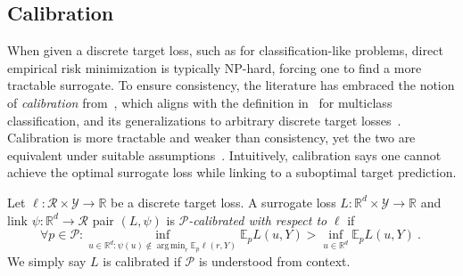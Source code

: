 \documentclass[anon,12pt]{colt2021} %
\newcommand{\reals}{\mathbb{R}}
\newcommand{\E}{\mathbb{E}}
\newcommand{\R}{\mathcal{R}}
\renewcommand{\P}{\mathcal{P}}
\newcommand{\Y}{\mathcal{Y}}
\newcommand{\exploss}[3]{\E_{#3} #1(#2,Y)}
\DeclareMathOperator*{\argmin}{arg\,min}
\begin{document}
\subsection{Calibration}\label{subsec:calibration}

When given a discrete target loss, such as for classification-like problems, direct empirical risk minimization is typically NP-hard, forcing one to find a more tractable surrogate.
To ensure consistency, the literature has embraced the notion of \emph{calibration} from~\citet[Chapter 3]{steinwart2008support}, which aligns with the definition in~\citet{tewari2007consistency} for multiclass classification, and its generalizations to arbitrary discrete target losses~\citep{agarwal2015consistent,ramaswamy2016convex}.
Calibration is more tractable and weaker than consistency, yet the two are equivalent under suitable assumptions~\cite{tewari2007consistency,ramaswamy2016convex}.
Intuitively, calibration says one cannot achieve the optimal surrogate loss while linking to a suboptimal target prediction.


\begin{definition}[Calibrated]\label{def:calibrated-finite}
	Let $\ell : \R \times \Y \to \reals$ be a discrete target loss.
	A surrogate loss $L : \reals^d \times \Y \to \reals$  and link $\psi:\reals^d \to \R$ pair $(L, \psi)$ is \emph{$\P$-calibrated with respect to} $\ell$ if 
	\begin{equation}\label{eq:calibration}
	\forall p \in \P: \inf_{u \in \reals^d : \psi(u) \not \in \argmin_r \E_p\ell(r,Y)} \exploss{L}{u}{p} > \inf_{u \in \reals^d} \exploss{L}{u}{p}~.~
	\end{equation}
	We simply say $L$ is calibrated if $\P$ is understood from context.
\end{definition}
\end{document}
